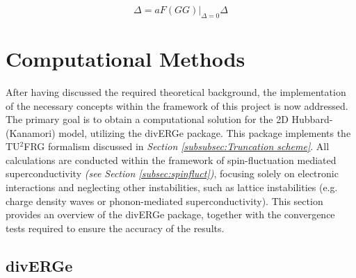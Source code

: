 \documentclass[11pt]{article}
\begin{document}
\begin{equation}\label{gapeq}
    \Delta = aF(GG)|_{\Delta = 0}\Delta
\end{equation}



\section{Computational Methods}

After having discussed the required theoretical background, the implementation of the necessary concepts within the framework of
this project is now addressed. The primary goal is to obtain a computational solution 
for the 2D Hubbard-(Kanamori) model, utilizing the divERGe package. This package implements the TU$^2$FRG
formalism discussed in \textit{Section \ref{subsubsec:Truncation scheme}}.
All calculations are conducted within the framework of spin-fluctuation mediated 
superconductivity \textit{(see Section \ref{subsec:spinfluct})}, focusing solely on  
electronic interactions and neglecting other instabilities, such as lattice 
instabilities (e.g. charge density waves or phonon-mediated superconductivity). 
This section provides an overview of the divERGe package, together with the convergence
tests required to ensure the accuracy of the results. 

\subsection{divERGe}
\label{subsec:diverge}
\end{document}
